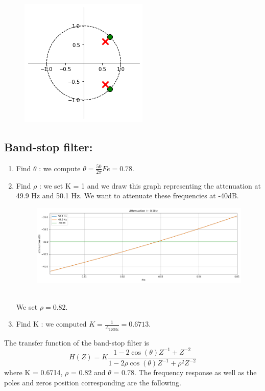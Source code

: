 \documentclass[]{article}
\begin{document}
\begin{figure}[H]
    \centering
    \includegraphics[scale=0.7]{q17.png}
\end{figure}


\subsection*{Band-stop filter:}
\begin{enumerate}
    \item Find $\theta$ : we compute $\theta = \frac{50}{2\pi}Fe = 0.78$.
    \item Find $\rho$ : we set K = 1 and we draw this graph representing the attenuation at 49.9 Hz and 50.1 Hz. 
    We want to attenuate these frequencies at -40dB.
    \begin{figure}[h]
        \centering
        \includegraphics[scale=0.5]{q13.png}
    \end{figure}\\
    We set $\rho = 0.82$.
    \item Find K : we computed $K = \frac{1}{A_{120\text{Hz}}}=0.6713$.
\end{enumerate}
The transfer function of the band-stop filter is 
$$H(Z) = K\frac{1 - 2\cos{(\theta)} Z^{-1} + Z^{-2}}{1 - 2\rho \cos{(\theta)Z^{-1} +\rho^2Z^{-2}}}$$
where K = 0.6714, $\rho$ = 0.82 and $\theta$ = 0.78. The frequency response as well as the poles and zeros position corresponding are the following.
\end{document}
